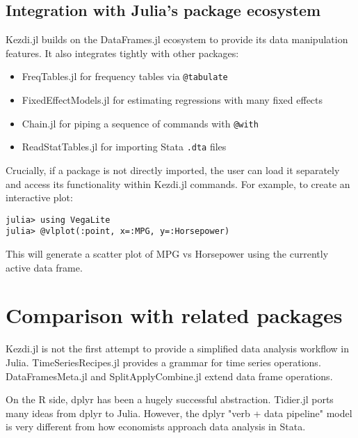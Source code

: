 \documentclass{juliacon}
\begin{document}
\subsection{Integration with Julia's package ecosystem}

Kezdi.jl builds on the DataFrames.jl ecosystem \citep{DataFrame.jl2023} to provide its data manipulation features. It also integrates tightly with other packages:

\begin{itemize}
    \item FreqTables.jl \citep{FreqTables.jl2023} for frequency tables via \texttt{@tabulate}
    \item FixedEffectModels.jl \citep{FixedEffectModels.jl2023} for estimating regressions with many fixed effects
    \item Chain.jl for piping a sequence of commands with \texttt{@with}
    \item ReadStatTables.jl for importing Stata \texttt{.dta} files
\end{itemize}

Crucially, if a package is not directly imported, the user can load it separately and access its functionality within Kezdi.jl commands. For example, to create an interactive plot:

\begin{verbatim}
julia> using VegaLite
julia> @vlplot(:point, x=:MPG, y=:Horsepower) 
\end{verbatim}

This will generate a scatter plot of MPG vs Horsepower using the currently active data frame.  

\section{Comparison with related packages}

Kezdi.jl is not the first attempt to provide a simplified data analysis workflow in Julia. TimeSeriesRecipes.jl \citep{TimeSeriesRecipes2022} provides a grammar for time series operations. DataFramesMeta.jl \citep{DataFramesMeta2023} and SplitApplyCombine.jl \citep{SplitApplyCombine2023} extend data frame operations. 

On the R side, dplyr \citep{dplyr2023} has been a hugely successful abstraction. Tidier.jl \citep{tidier2022} ports many ideas from dplyr to Julia. However, the dplyr "verb + data pipeline" model is very different from how economists approach data analysis in Stata.
\end{document}
